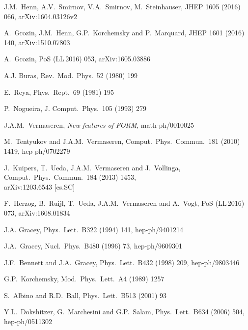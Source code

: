 \documentclass[12pt]{article}
\begin{document}
{\begin{thebibliography}{99}
J.M.~Henn, A.V.~Smirnov, V.A.~Smirnov, M.~Steinhauser,
  JHEP 1605 (2016) 066, arXiv:1604.03126v2

A.~Grozin, J.M.~Henn, G.P.~Korchemsky and P.~Marquard,
  JHEP 1601 (2016) 140, arXiv:1510.07803

A.~Grozin,
  PoS (LL$\,$2016) 053, arXiv:1605.03886

A.J. Buras, Rev.\ Mod.\ Phys.\ 52 (1980) 199

E.~Reya, Phys.\ Rept.\ 69 (1981) 195

P.~Nogueira,
  J. Comput.\ Phys.\ 105 (1993) 279

J.A.M.~Vermaseren, {\it New features of FORM}, math-ph/0010025

M.~Tentyukov and J.A.M.~Vermaseren,
  Comput.\ Phys.\ Commun.\  181 (2010) 1419, hep-ph/0702279

J.~Kuipers, T.~Ueda, J.A.M.~Vermaseren and J.~Vollinga,
  Comput.\ Phys.\ Commun.\ 184 (2013) 1453, \\[1mm]
  arXiv:1203.6543 [cs.SC]

  F.~Herzog, B.~Ruijl, T.~Ueda, J.A.M.~Vermaseren and A.~Vogt,
  PoS (LL$\,$2016) 073, arXiv:1608.01834 

J.A. Gracey,
  Phys.\ Lett.\ B322 (1994) 141, hep-ph/9401214

J.A.~Gracey,
  Nucl.\ Phys.\ B480 (1996) 73, hep-ph/9609301

J.F.~Bennett and J.A.~Gracey,
  Phys.\ Lett.\ B432 (1998) 209, hep-ph/9803446

G.P.~Korchemsky,
  Mod.\ Phys.\ Lett.\ A4 (1989) 1257

S.~Albino and R.D.~Ball,
  Phys.\ Lett.\ B513 (2001) 93

Y.L.~Dokshitzer, G.~Marchesini and G.P.~Salam,
  Phys.\ Lett.\ B634 (2006) 504, hep-ph/0511302


\end{thebibliography}}
\end{document}
